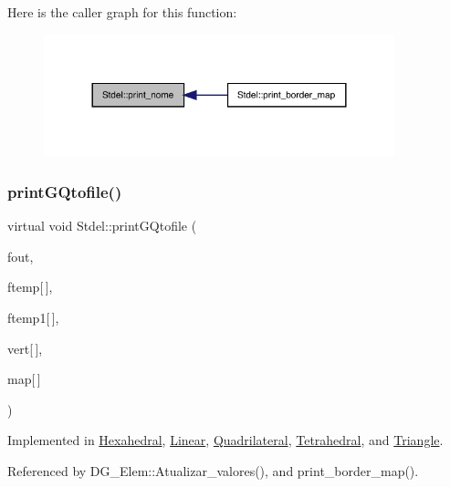 Here is the caller graph for this function\+:
\nopagebreak
\begin{figure}[H]
\begin{center}
\leavevmode
\includegraphics[width=288pt]{classStdel_ac654f45f744ec4cfeab74ed4ded99ef5_icgraph}
\end{center}
\end{figure}
\mbox{\label{classStdel_a8196ddf2ec3c88627e33d19f93fdb354}} 
\subsubsection{\texorpdfstring{print\+G\+Qtofile()}{printGQtofile()}}
{\footnotesize\ttfamily virtual void Stdel\+::print\+G\+Qtofile (\begin{DoxyParamCaption}\item[{F\+I\+LE $\ast$}]{fout,  }\item[{const double}]{ftemp\mbox{[}$\,$\mbox{]},  }\item[{const double}]{ftemp1\mbox{[}$\,$\mbox{]},  }\item[{const \hyperlink{structVertice}{Vertice}}]{vert\mbox{[}$\,$\mbox{]},  }\item[{const int}]{map\mbox{[}$\,$\mbox{]} }\end{DoxyParamCaption})\hspace{0.3cm}{\ttfamily [pure virtual]}}



Implemented in \hyperlink{classHexahedral_ae32d2d1e79c93e4346fcf0b4483ae218}{Hexahedral}, \hyperlink{classLinear_ac9e8aae8711e4cbce11a4f685017b1d3}{Linear}, \hyperlink{classQuadrilateral_a26cf4e787eb83848937831b5e388a05f}{Quadrilateral}, \hyperlink{classTetrahedral_aa5daeb6d0461824263d4af49aeb15134}{Tetrahedral}, and \hyperlink{classTriangle_a0ab3ad47c3e5432601110f246dec7652}{Triangle}.



Referenced by D\+G\+\_\+\+Elem\+::\+Atualizar\+\_\+valores(), and print\+\_\+border\+\_\+map().

